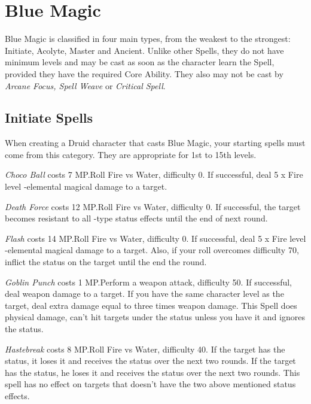 \section{Blue Magic}\label{sec:magic-blue}
\begin{multicols}{2}

Blue Magic is classified in four main types, from the weakest to the strongest: Initiate, Acolyte, Master and Ancient. Unlike other Spells, they do not have minimum levels and may be cast as soon as the character learn the Spell, provided they have the required Core Ability. They also may not be cast by \textit{Arcane Focus, Spell Weave} or \textit{Critical Spell}.
 
\subsection{Initiate Spells}\label{subsec:blue-initiate}
	When creating a Druid character that casts Blue Magic, your starting spells must come from this category. They are appropriate for 1st to 15th levels.

    \textit{Choco Ball} costs 7 MP.\@{}Roll Fire vs Water, difficulty 0. If successful, deal 5 x Fire level -elemental magical damage to a target.

    \textit{Death Force} costs 12 MP.\@{}Roll Fire vs Water, difficulty 0. If successful, the target becomes resistant to all -type status effects until the end of next round.

	\textit{Flash} costs 14 MP.\@{}Roll Fire vs Water, difficulty 0. If successful, deal 5 x Fire level -elemental magical damage to a target. Also, if your roll overcomes difficulty 70, inflict the  status on the target until the end the round.
	
    \textit{Goblin Punch} costs 1 MP.\@{}Perform a weapon attack, difficulty 50. If successful, deal weapon damage to a target. If you have the same character level as the target, deal extra damage equal to three times weapon damage. This Spell does physical damage, can’t hit targets under the  status unless you have it and ignores the  status.

    \textit{Hastebreak} costs 8 MP.\@{}Roll Fire vs Water, difficulty 40. If the target has the  status, it loses it and receives the  status over the next two rounds. If the target has the  status, he loses it and receives the  status over the next two rounds. This spell has no effect on targets that doesn’t have the two above mentioned status effects.
    

\end{multicols}
